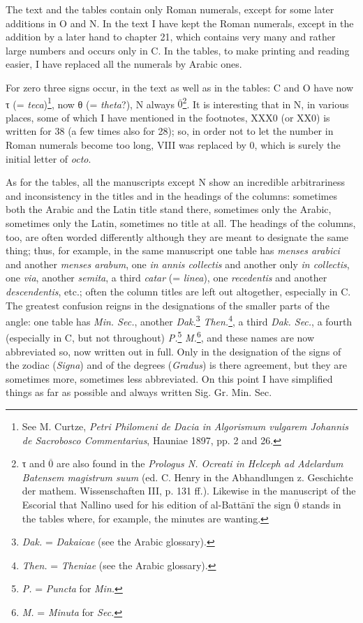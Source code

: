 \documentclass[11pt]{article}
\newcommand{\Pg}[1]{\marginpar{\footnotesize\color{gray}#1}}
\begin{document}
\par The text and the tables contain only Roman numerals, except for some later additions in O and N. In the text I have kept the Roman numerals, except in the addition by a later hand to chapter 21, which contains very many and rather large numbers and occurs only in C. In the tables, to make printing and reading easier, I have replaced all the numerals by Arabic ones.\par
\par For zero three signs occur, in the text as well as in the tables: C and O have now {\greekfont τ} (= \emph{teca})\footnote{See M. Curtze, \emph{Petri Philomeni de Dacia in Algorismum vulgarem Johannis de Sacrobosco Commentarius}, Hauniae 1897, pp. 2 and 26.}, now {\greekfont θ} (= \emph{theta}?), N always $\overline{0}$\footnote{{\greekfont τ} and $\overline{0}$ are also found in the \emph{Prologus N. Ocreati in Helceph ad Adelardum Batensem magistrum suum} (ed. C. Henry in the Abhandlungen z. Geschichte der mathem. Wissenschaften III, p. 131 ff.). Likewise in the manuscript of the Escorial that Nallino used for his edition of al-Battānī the sign $\overline{0}$ stands in the tables where, for example, the minutes are wanting.}. It is interesting that in N, in various places, some of which I have mentioned in the footnotes, XXX0 (or XX0) is written for 38 (a few times also for 28); so, in order not to let the number in Roman numerals become too long, VIII was replaced by 0, which is surely the initial letter of \emph{octo}.\par
\par As for the tables, all the manuscripts except N show an incredible arbitrariness and inconsistency in the titles and in the headings of the columns: sometimes both the Arabic and the Latin title stand there, sometimes only the Arabic, sometimes only the Latin, sometimes no title at all. The headings of the columns, too, are often worded differently although they are meant to designate the same thing; thus, for example, in the same manuscript one table has \emph{menses arabici} and another \emph{menses arabum}, one \emph{in annis collectis} and another only \emph{in collectis}, one \emph{via}, another \emph{semita}, a third \emph{catar} (= \emph{linea}), one \emph{recedentis} and another \emph{descendentis}, etc.; often the column titles are left out altogether, especially in C. The greatest confusion reigns in the designations of the smaller parts of the angle: one table has \emph{Min. Sec.}, another \emph{Dak.}\footnote{\emph{Dak.} = \emph{Dakaicae} (see the Arabic glossary).} \emph{Then.}\footnote{\emph{Then.} = \emph{Theniae} (see the Arabic glossary).}, a third \emph{Dak. Sec.}, a fourth (especially in C, but not throughout) \emph{P.}\footnote{\emph{P.} = \emph{Puncta} for \emph{Min.}} \emph{M.}\footnote{\emph{M.} = \emph{Minuta} for \emph{Sec.}}, and these names are now abbreviated so, now written out in full. Only in the designation of the signs of the zodiac (\emph{Signa}) and of the degrees (\emph{Gradus}) is there agreement, but they are \Pg{XXIV}sometimes more, sometimes less abbreviated. On this point I have simplified things as far as possible and always written Sig. Gr. Min. Sec.\par
\end{document}

